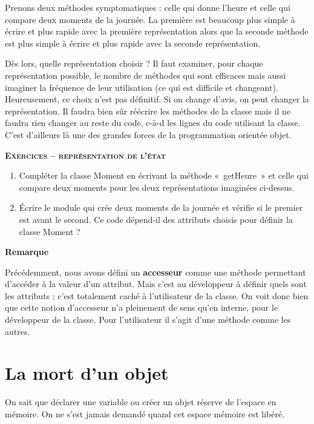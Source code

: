 Prenons deux méthodes symptomatiques : celle qui donne
l'heure et celle qui compare deux moments de la
journée. La première est beaucoup plus simple à écrire et plus rapide
avec la première représentation alors que la seconde méthode est plus
simple à écrire et plus rapide avec la seconde représentation.

Dès lors, quelle représentation choisir ? Il faut examiner, pour chaque
représentation possible, le nombre de méthodes qui sont efficaces mais
aussi imaginer la fréquence de leur utilisation (ce qui est difficile
et changeant). Heureusement, ce choix n'est pas
définitif. Si on change d'avis, on peut changer la
représentation. Il faudra bien sûr réécrire les méthodes de la classe
mais il ne faudra rien changer au reste du code, c-à-d les lignes du
code utilisant la classe. C’est d’ailleurs là une des grandes forces de
la programmation orientée objet.

{\sffamily\bfseries\scshape
Exercices – représentation de l'état}

\begin{enumerate}
	\item 
		Compléter la classe Moment en écrivant la méthode «~getHeure~» et celle
		qui compare deux moments pour les deux représentations imaginées
		ci-dessus.
	\item 
		Écrire le module qui crée deux moments de la journée et vérifie si le
		premier est avant le second. Ce code dépend-il des attributs choisis
		pour définir la classe Moment ?
\end{enumerate}

{\bfseries
Remarque}

Précédemment, nous avons défini un \textbf{accesseur} comme une méthode
permettant d’accéder à la valeur d’un attribut. Mais c’est au
développeur à définir quels sont les attributs ; c’est totalement caché
à l’utilisateur de la classe. On voit donc bien que cette notion
d’accesseur n’a pleinement de sens qu’en interne, pour le développeur
de la classe. Pour l’utilisateur il s’agit d’une méthode comme les
autres.


\section{La mort d'un objet}

On sait que déclarer une variable ou créer un objet réserve de l’espace
en mémoire. On ne s’est jamais demandé quand cet espace mémoire est
libéré.

